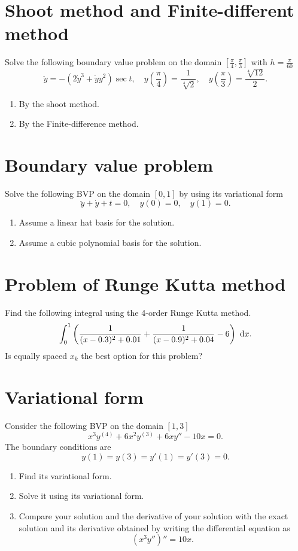 \section{Shoot method and Finite-different method}
Solve the following boundary value problem on the domain \(\left[\frac{\pi}{4},\frac{\pi}{3}\right]\) with \(h=\frac{\pi}{60}\)
\[ \ddot{y}=-\left(2\dot{y}^3+\dot{y}y^2\right)\sec t, \quad y\left(\frac{\pi}{4}\right)=\frac{1}{\sqrt[4]{2}}, \quad y\left(\frac{\pi}{3}\right)=\frac{\sqrt[4]{12}}{2}. \]
\begin{enumerate}
	\item By the shoot method.
	\item By the Finite-difference method.
\end{enumerate}


\section{Boundary value problem}
Solve the following BVP on the domain \([0,1]\) by using its variational form
\[ \ddot{y}+\dot{y}+t=0, \quad y(0)=0, \quad y(1)=0. \]
\begin{enumerate}
	\item Assume a linear hat basis for the solution.
	\item Assume a cubic polynomial basis for the solution.
\end{enumerate}


\section{Problem of Runge Kutta method}
Find the following integral using the 4-order Runge Kutta method.
\[ \int_{0}^{1}\left(\frac{1}{(x-0.3)^2+0.01}+\frac{1}{(x-0.9)^2+0.04}-6\right)~\mathrm{d} x. \]
Is equally spaced \(x_k\) the best option for this problem?


\section{Variational form}
Consider the following BVP on the domain \([1,3]\)
\[ x^3y^{(4)}+6x^2y^{(3)}+6xy''-10x=0. \]
The boundary conditions are
\[ y(1)=y(3)=y'(1)=y'(3)=0. \]
\begin{enumerate}
	\item Find its variational form.
	\item Solve it using its variational form.
	\item Compare your solution and the derivative of your solution with the exact solution and its derivative obtained by writing the differential equation as
	\[ \left(x^3 y''\right)''=10x. \]
\end{enumerate}